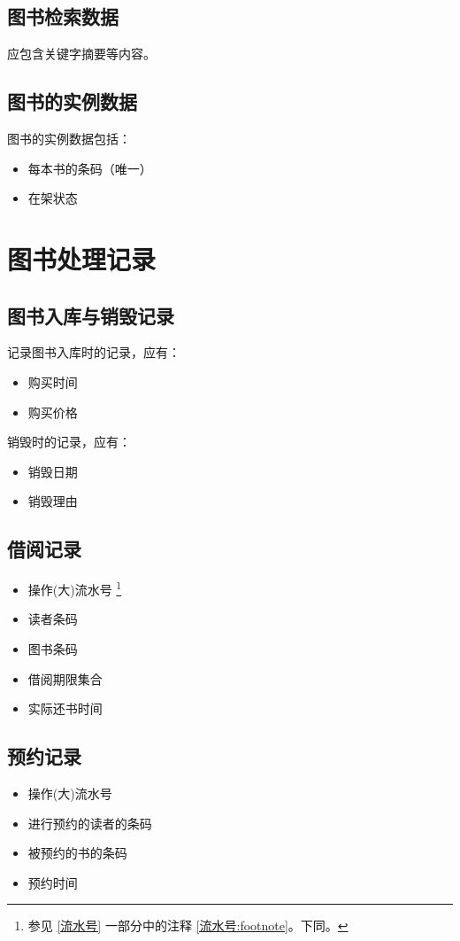 \documentclass[UTF8]{report}
\begin{document}
    \subsection{图书检索数据}
    应包含关键字摘要等内容。
    \subsection{图书的实例数据}
    图书的实例数据包括：
    \begin{itemize}
    	\item 每本书的条码（唯一）
    	\item 在架状态
    \end{itemize}
    \section{图书处理记录}
    \subsection{图书入库与销毁记录}
    记录图书入库时的记录，应有：
    \begin{itemize}
        \item 购买时间
        \item 购买价格
    \end{itemize}

    销毁时的记录，应有：
    \begin{itemize}
        \item 销毁日期
        \item 销毁理由
    \end{itemize}
    \subsection{借阅记录}
    \begin{itemize}
        \item 操作(大)流水号 \footnote{\label{参见}
            参见  \ref{流水号} 一部分中的注释 \ref{流水号:footnote}。下同。}
        \item 读者条码
        \item 图书条码
        \item 借阅期限集合
        \item 实际还书时间
    \end{itemize}
    \subsection{预约记录}
    \begin{itemize}
        \item 操作(大)流水号
        \item 进行预约的读者的条码
        \item 被预约的书的条码
        \item 预约时间
    \end{itemize}
\end{document}
